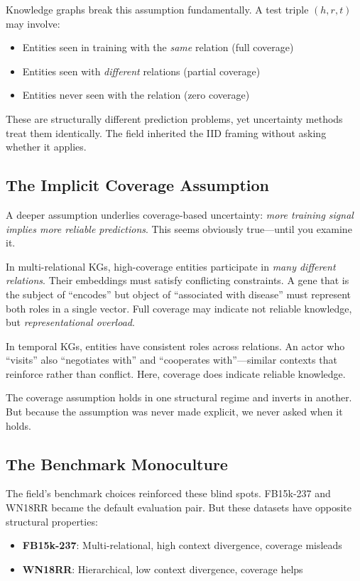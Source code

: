 \documentclass{article}
\begin{document}
Knowledge graphs break this assumption fundamentally. A test triple $(h, r, t)$ may involve:
\begin{itemize}
    \item Entities seen in training with the \emph{same} relation (full coverage)
    \item Entities seen with \emph{different} relations (partial coverage)
    \item Entities never seen with the relation (zero coverage)
\end{itemize}

These are structurally different prediction problems, yet uncertainty methods treat them identically. The field inherited the IID framing without asking whether it applies.

\subsection{The Implicit Coverage Assumption}

A deeper assumption underlies coverage-based uncertainty: \emph{more training signal implies more reliable predictions}. This seems obviously true---until you examine it.

In multi-relational KGs, high-coverage entities participate in \emph{many different relations}. Their embeddings must satisfy conflicting constraints. A gene that is the subject of ``encodes'' but object of ``associated with disease'' must represent both roles in a single vector. Full coverage may indicate not reliable knowledge, but \emph{representational overload}.

In temporal KGs, entities have consistent roles across relations. An actor who ``visits'' also ``negotiates with'' and ``cooperates with''---similar contexts that reinforce rather than conflict. Here, coverage does indicate reliable knowledge.

The coverage assumption holds in one structural regime and inverts in another. But because the assumption was never made explicit, we never asked when it holds.

\subsection{The Benchmark Monoculture}

The field's benchmark choices reinforced these blind spots. FB15k-237 and WN18RR became the default evaluation pair. But these datasets have opposite structural properties:
\begin{itemize}
    \item \textbf{FB15k-237}: Multi-relational, high context divergence, coverage misleads
    \item \textbf{WN18RR}: Hierarchical, low context divergence, coverage helps
\end{itemize}
\end{document}

